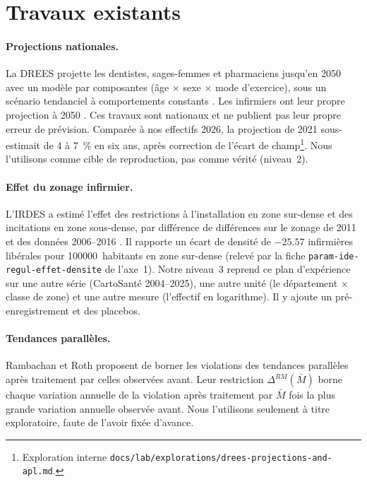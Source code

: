 \documentclass[11pt]{article}
\begin{document}
\section{Travaux existants}
\paragraph{Projections nationales.} La DREES projette les dentistes, sages-femmes et pharmaciens
jusqu'en 2050 avec un modèle par composantes (âge $\times$ sexe $\times$ mode d'exercice), sous un
scénario tendanciel à comportements constants \citep{drees2021dd76}. Les infirmiers ont leur propre
projection à 2050 \citep{er1319}. Ces travaux sont nationaux et ne publient pas leur propre erreur
de prévision. Comparée à nos effectifs 2026, la projection de 2021 sous-estimait de 4 à
7\derive{}~\% en six ans, après correction de l'écart de champ\footnote{Exploration interne
\texttt{docs/lab/explorations/drees-projections-and-apl.md}.}. Nous l'utilisons comme cible de
reproduction, pas comme vérité (niveau~2).

\paragraph{Effet du zonage infirmier.} L'IRDES a estimé l'effet des restrictions à l'installation en
zone sur-dense et des incitations en zone sous-dense, par différence de différences sur le zonage de
2011 et des données 2006--2016 \citep{irdes270}. Il rapporte un écart de densité de $-\num{25.57}$\mesure{}
infirmières libérales pour \num{100000}~habitants en zone sur-dense (relevé par la fiche
\texttt{param-ide-regul-effet-densite} de l'axe~1). Notre niveau~3 reprend ce plan d'expérience sur
une autre série (CartoSanté 2004--2025), une autre unité (le département $\times$ classe de zone) et
une autre mesure (l'effectif en logarithme). Il y ajoute un pré-enregistrement et des placebos.

\paragraph{Tendances parallèles.} Rambachan et Roth \citep{rambachan2023} proposent de borner les
violations des tendances parallèles après traitement par celles observées avant. Leur restriction
$\Delta^{RM}(\bar M)$ borne chaque variation annuelle de la violation après traitement par
$\bar M$ fois la plus grande variation annuelle observée avant. Nous l'utilisons seulement à titre
exploratoire, faute de l'avoir fixée d'avance.
\end{document}
